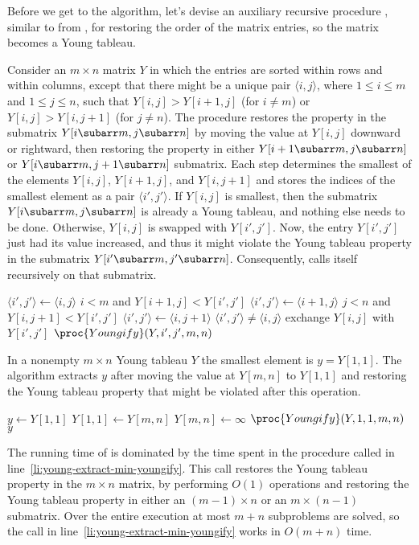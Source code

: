 Before we get to the algorithm, let's devise an auxiliary recursive procedure , similar to  from , for restoring the order of the matrix entries, so the matrix becomes a Young tableau.

Consider an $m\times n$ matrix $Y$ in which the entries are sorted within rows and within columns, except that there might be a unique pair $\langle i,j\rangle$, where $1\le i\le m$ and $1\le j\le n$, such that $Y[i,j]>Y[i+1,j]$ (for $i\ne m$) or $Y[i,j]>Y[i,j+1]$ (for $j\ne n$).
The procedure restores the property in the submatrix $Y[i\subarr m,j\subarr n]$ by moving the value at $Y[i,j]$ downward or rightward, then restoring the property in either $Y[i+1\subarr m,j\subarr n]$ or $Y[i\subarr m,j+1\subarr n]$ submatrix.
Each step determines the smallest of the elements $Y[i,j]$, $Y[i+1,j]$, and $Y[i,j+1]$ and stores the indices of the smallest element as a pair $\langle i',j'\rangle$.
If $Y[i,j]$ is smallest, then the submatrix $Y[i\subarr m,j\subarr n]$ is already a Young tableau, and nothing else needs to be done.
Otherwise, $Y[i,j]$ is swapped with $Y[i',j']$.
Now, the entry $Y[i',j']$ just had its value increased, and thus it might violate the Young tableau property in the submatrix $Y[i'\subarr m,j'\subarr n]$.
Consequently,  calls itself recursively on that submatrix.

\begin{codebox}
\li $\langle i',j'\rangle\gets\langle i,j\rangle$
\li \If $i<m$ and $Y[i+1,j]<Y[i',j']$
\li     \Then $\langle i',j'\rangle\gets\langle i+1,j\rangle$
        \End
\li \If $j<n$ and $Y[i,j+1]<Y[i',j']$
\li     \Then $\langle i',j'\rangle\gets\langle i,j+1\rangle$
        \End
\li \If $\langle i',j'\rangle\ne\langle i,j\rangle$
\li     \Then exchange $Y[i,j]$ with $Y[i',j']$
\li         $\proc{Youngify}(Y,i',j',m,n)$
        \End
\end{codebox}

In a nonempty $m\times n$ Young tableau $Y$ the smallest element is $y=Y[1,1]$.
The  algorithm extracts $y$ after moving the value at $Y[m,n]$ to $Y[1,1]$ and restoring the Young tableau property that might be violated after this operation.

\begin{codebox}
\li $y\gets Y[1,1]$
\li $Y[1,1]\gets Y[m,n]$
\li $Y[m,n]\gets\infty$
\li $\proc{Youngify}(Y,1,1,m,n)$ \label{li:young-extract-min-youngify}
\li \Return $y$
\end{codebox}

The running time of  is dominated by the time spent in the  procedure called in line~\ref{li:young-extract-min-youngify}.
This call restores the Young tableau property in the $m\times n$ matrix, by performing $O(1)$ operations and restoring the Young tableau property in either an $(m-1)\times n$ or an $m\times(n-1)$ submatrix.
Over the entire execution at most $m+n$ subproblems are solved, so the call in line~\ref{li:young-extract-min-youngify} works in $O(m+n)$ time.

